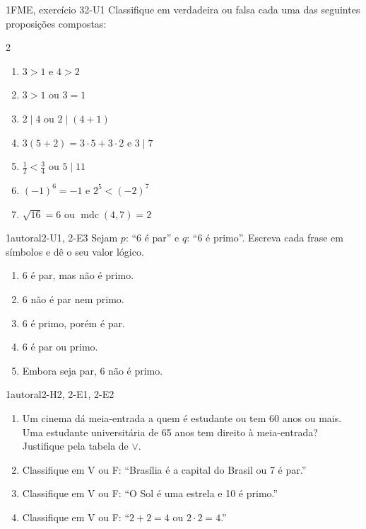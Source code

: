 \Questoes

\begin{questao}{1}{FME, exercício 3}{2-U1}\label{u2:q1}
Classifique em verdadeira ou falsa cada uma das seguintes proposições compostas:
\begin{multicols}{2}
\begin{enumerate}[label=\alph*)]
  \item $3>1$ e $4>2$
  \item $3>1$ ou $3=1$
  \item $2\mid 4$ ou $2\mid(4+1)$
  \item $3(5+2)=3\cdot5+3\cdot2$ e $3\mid 7$
  \item $\tfrac12<\tfrac34$ ou $5\mid 11$
  \item $(-1)^6=-1$ e $2^5<(-2)^7$
  \item $\sqrt{16}=6$ ou $\operatorname{mdc}(4,7)=2$
\end{enumerate}
\end{multicols}
\end{questao}

\begin{questao}{1}{autoral}{2-U1, 2-E3}\label{u2:q2}
Sejam $p$: \enquote{6 é par} e $q$: \enquote{6 é primo}. Escreva cada frase em símbolos e dê o seu valor lógico.
\begin{enumerate}[label=\alph*)]
  \item 6 é par, mas não é primo.
  \item 6 não é par nem primo.
  \item 6 é primo, porém é par.
  \item 6 é par ou primo.
  \item Embora seja par, 6 não é primo.
\end{enumerate}
\end{questao}

\begin{questao}{1}{autoral}{2-H2, 2-E1, 2-E2}\label{u2:q3}
\begin{enumerate}[label=\alph*)]
  \item Um cinema dá meia-entrada a quem é estudante ou tem 60 anos ou mais. Uma estudante universitária de 65 anos tem direito à meia-entrada? Justifique pela tabela de $\vee$.
  \item Classifique em V ou F: \enquote{Brasília é a capital do Brasil ou 7 é par.}
  \item Classifique em V ou F: \enquote{O Sol é uma estrela e 10 é primo.}
  \item Classifique em V ou F: \enquote{$2+2=4$ ou $2\cdot2=4$.}
\end{enumerate}
\end{questao}

